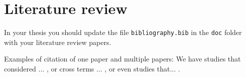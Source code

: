 \chapter{Literature review} \label{chap:lit}

In your thesis you should update the file \texttt{bibliography.bib} in the \texttt{doc} folder with your literature review papers.

Examples of citation of one paper and multiple papers: We have studies that considered ... \cite{smith0000}, or cross terms ... \cite{smith0000}, or even studies that... \cite{smith0000}.
